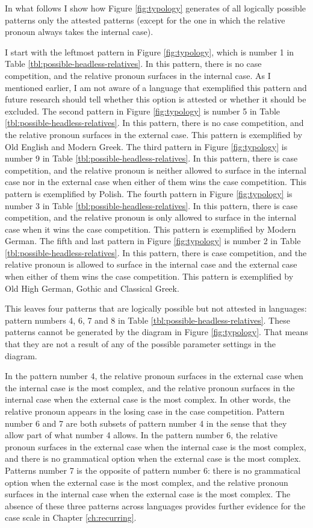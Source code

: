 In what follows I show how Figure \ref{fig:typology} generates of all logically possible patterns only the attested patterns (except for the one in which the relative pronoun always takes the internal case).

I start with the leftmost pattern in Figure \ref{fig:typology}, which is number 1 in Table \ref{tbl:possible-headless-relatives}. In this pattern, there is no case competition, and the relative pronoun surfaces in the internal case. As I mentioned earlier, I am not aware of a language that exemplified this pattern and future research should tell whether this option is attested or whether it should be excluded.
The second pattern in Figure \ref{fig:typology} is number 5 in Table \ref{tbl:possible-headless-relatives}. In this pattern, there is no case competition, and the relative pronoun surfaces in the external case. This pattern is exemplified by Old English and Modern Greek.
The third pattern in Figure \ref{fig:typology} is number 9 in Table \ref{tbl:possible-headless-relatives}. In this pattern, there is case competition, and the relative pronoun is neither allowed to surface in the internal case nor in the external case when either of them wins the case competition. This pattern is exemplified by Polish.
The fourth pattern in Figure \ref{fig:typology} is number 3 in Table \ref{tbl:possible-headless-relatives}. In this pattern, there is case competition, and the relative pronoun is only allowed to surface in the internal case when it wins the case competition. This pattern is exemplified by Modern German.
The fifth and last pattern in Figure \ref{fig:typology} is number 2 in Table \ref{tbl:possible-headless-relatives}. In this pattern, there is case competition, and the relative pronoun is allowed to surface in the internal case and the external case when either of them wins the case competition. This pattern is exemplified by Old High German, Gothic and Classical Greek.

This leaves four patterns that are logically possible but not attested in languages: pattern numbers 4, 6, 7 and 8 in Table \ref{tbl:possible-headless-relatives}. These patterns cannot be generated by the diagram in Figure \ref{fig:typology}. That means that they are not a result of any of the possible parameter settings in the diagram.

In the pattern number 4, the relative pronoun surfaces in the external case when the internal case is the most complex, and the relative pronoun surfaces in the internal case when the external case is the most complex. In other words, the relative pronoun  appears in the losing case in the case competition.
Pattern number 6 and 7 are both subsets of pattern number 4 in the sense that they allow part of what number 4 allows.
In the pattern number 6, the relative pronoun surfaces in the external case when the internal case is the most complex, and there is no grammatical option when the external case is the most complex.
Patterns number 7 is the opposite of pattern number 6: there is no grammatical option when the external case is the most complex, and the relative pronoun surfaces in the internal case when the external case is the most complex.
The absence of these three patterns across languages provides further evidence for the case scale in Chapter \ref{ch:recurring}.

